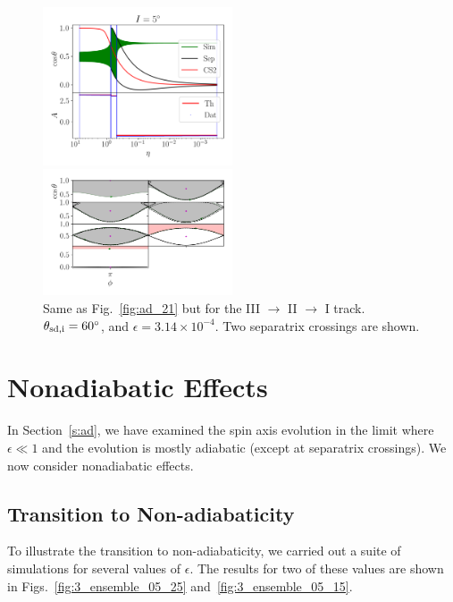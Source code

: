 \documentclass[
        fleqn,
        usenatbib,
    ]{mnras}
\begin{document}
\begin{figure}
    \centering
    \includegraphics[width=0.5\textwidth]{plots_diskdisp/3testo321.png}

    \includegraphics[width=0.5\textwidth]{plots_diskdisp/3testo321_subplots.png}
    \caption{Same as Fig.~\ref{fig:ad_21} but for the III $\to$ II $\to$ I
    track. $\theta_{\rm sd, i} = 60^\circ$, and $\epsilon = 3.14 \times
    10^{-4}$. Two separatrix crossings are shown.}\label{fig:ad_321}
\end{figure}

\section{Nonadiabatic Effects}\label{s:nonad}

In Section~\autoref{s:ad}, we have examined the spin axis evolution in the limit
where $\epsilon \ll 1$ and the evolution is mostly adiabatic (except at
separatrix crossings). We now consider nonadiabatic effects.

\subsection{Transition to Non-adiabaticity}\label{ss:transition}

To illustrate the transition to non-adiabaticity, we carried out a suite of
simulations for several values of $\epsilon$. The results for two of these
values are shown in Figs.~\ref{fig:3_ensemble_05_25}
and~\ref{fig:3_ensemble_05_15}.
\end{document}
